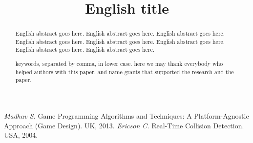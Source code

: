 \documentclass[intlimits,twoside,a4paper,11pt]{article}
\begin{document}


    \begin{translatedpart}
        \title{English title}



        \maketranslatedtitle

        \begin{abstract}
            English abstract goes here. English abstract goes here. English abstract goes here. English abstract goes here.
            English abstract goes here. English abstract goes here. English abstract goes here. English abstract goes here.

            \keywords keywords, separated by comma, in lower case.
            \autocitationexample
            \acknowledgements here we may thank everybody who helped authors with this paper, and name grants that supported the research and the paper.
        \end{abstract}

        \begin{thebibliography}{9}
             {\it Madhav S.} Game Programming Algorithms and Techniques: A Platform-Agnostic Approach (Game Design). UK, 2013.
             {\it Ericson C.} Real-Time Collision Detection. USA, 2004.
        \end{thebibliography}

    \end{translatedpart}
\end{document}
